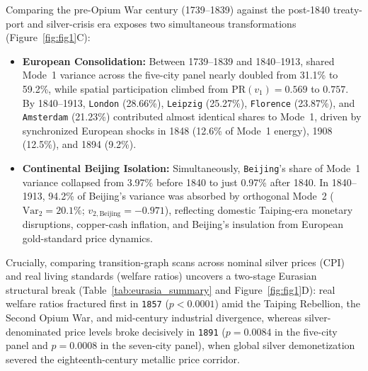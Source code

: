 \documentclass[11pt,a4paper]{article}
\begin{document}
Comparing the pre-Opium War century (1739--1839) against the post-1840 treaty-port and silver-crisis era exposes two simultaneous transformations (Figure~\ref{fig:fig1}C):
\begin{itemize}
    \item \textbf{European Consolidation:} Between 1739--1839 and 1840--1913, shared Mode~1 variance across the five-city panel nearly doubled from 31.1\% to 59.2\%, while spatial participation climbed from $\mathrm{PR}(v_1) = 0.569$ to $0.757$. By 1840--1913, \texttt{London} (28.66\%), \texttt{Leipzig} (25.27\%), \texttt{Florence} (23.87\%), and \texttt{Amsterdam} (21.23\%) contributed almost identical shares to Mode~1, driven by synchronized European shocks in 1848 (12.6\% of Mode~1 energy), 1908 (12.5\%), and 1894 (9.2\%).
    \item \textbf{Continental Beijing Isolation:} Simultaneously, \texttt{Beijing}'s share of Mode~1 variance collapsed from 3.97\% before 1840 to just 0.97\% after 1840. In 1840--1913, 94.2\% of Beijing's variance was absorbed by orthogonal Mode~2 ($\mathrm{Var}_2 = 20.1\%$; $v_{2,\mathrm{Beijing}} = -0.971$), reflecting domestic Taiping-era monetary disruptions, copper-cash inflation, and Beijing's insulation from European gold-standard price dynamics.
\end{itemize}

Crucially, comparing transition-graph scans across nominal silver prices (CPI) and real living standards (welfare ratios) uncovers a two-stage Eurasian structural break (Table~\ref{tab:eurasia_summary} and Figure~\ref{fig:fig1}D): real welfare ratios fractured first in \texttt{1857} ($p < 0.0001$) amid the Taiping Rebellion, the Second Opium War, and mid-century industrial divergence, whereas silver-denominated price levels broke decisively in \texttt{1891} ($p = 0.0084$ in the five-city panel and $p = 0.0008$ in the seven-city panel), when global silver demonetization severed the eighteenth-century metallic price corridor.
\end{document}
